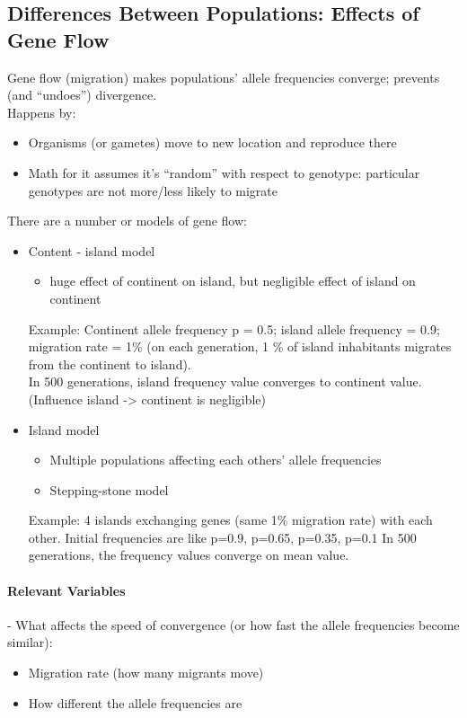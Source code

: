 \documentclass{scrartcl}
\begin{document}
\subsection{Differences Between Populations: Effects of Gene Flow}
\label{sec:06-5}
Gene flow (migration) makes populations' allele frequencies converge; prevents (and ``undoes'') divergence.\\
Happens by:
\begin{itemize}
\item Organisms (or gametes) move to new location and reproduce there
\item Math for it assumes it's ``random'' with respect to genotype: particular genotypes are not more/less likely to migrate
\end{itemize}
There are a number or models of gene flow:
\begin{itemize}
\item Content - island model
  \begin{itemize}
  \item huge effect of continent on island, but negligible effect of island on continent
  \end{itemize}
Example: Continent allele frequency p = 0.5; island allele frequency = 0.9; migration rate = 1\% (on each generation, 1 \% of island inhabitants migrates from the continent to island).\\
In 500 generations, island frequency value converges to continent value.
(Influence island -> continent is negligible)
\item Island model
  \begin{itemize}
  \item Multiple populations affecting each others' allele frequencies
  \item Stepping-stone model
  \end{itemize}
Example: 4 islands exchanging genes (same 1\% migration rate) with each other.
Initial frequencies are like p=0.9, p=0.65, p=0.35, p=0.1
In 500 generations, the frequency values converge on mean value.
\end{itemize}

\paragraph{Relevant Variables}
- What affects the speed of convergence (or how fast the allele frequencies become similar):
\begin{itemize}
\item Migration rate (how many migrants move)
\item How different the allele frequencies are
\end{itemize}
\end{document}
